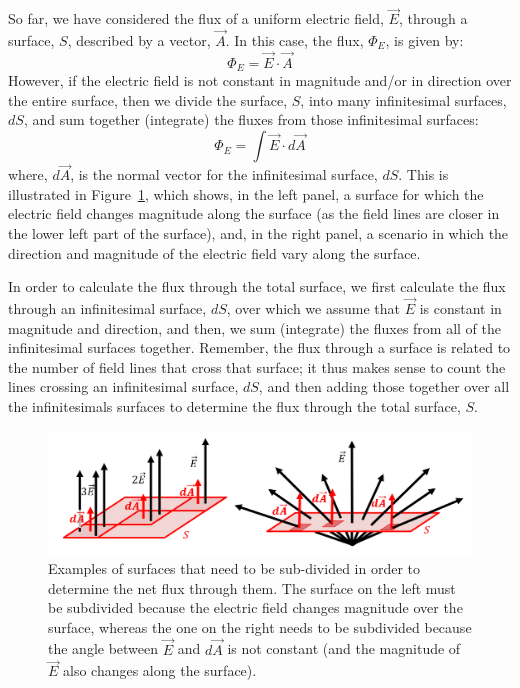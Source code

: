 So far, we have considered the flux of a uniform electric field, $\vec E$, through a surface, $S$, described by a vector, $\vec A$. In this case, the flux, $\Phi_E$, is given by:
\begin{equation}
\Phi_E=\vec E\cdot \vec A
\end{equation}
However, if the electric field is not constant in magnitude and/or in direction over the entire surface, then we divide the surface, $S$, into many infinitesimal surfaces, $dS$, and sum together (integrate) the fluxes from those infinitesimal surfaces:
\begin{equation}
\boxed{\Phi_E=\int \vec E\cdot d\vec A}
\end{equation}
where, $d\vec A$, is the normal vector for the infinitesimal surface, $dS$. This is illustrated in Figure~\ref{fig:gauss:fluxdA}, which shows, in the left panel, a surface for which the electric field changes magnitude along the surface (as the field lines are closer in the lower left part of the surface), and, in the right panel, a scenario in which the direction and magnitude of the electric field vary along the surface.

In order to calculate the flux through the total surface, we first calculate the flux through an infinitesimal surface, $dS$, over which we assume that $\vec E$ is constant in magnitude and direction, and then, we sum (integrate) the fluxes from all of the infinitesimal surfaces together. Remember, the flux through a surface is related to the number of field lines that cross that surface; it thus makes sense to count the lines crossing an infinitesimal surface, $dS$, and then adding those together over all the infinitesimals surfaces to determine the flux through the total surface, $S$.

\begin{figure}[!htbp]
\centering
\includegraphics[width=0.9\linewidth]{files/fluxdA-675e21c7412f32ffebdb6ac667e6b1ef.png}
\caption[]{Examples of surfaces that need to be sub-divided in order to determine the net flux through them. The surface on the left must be subdivided because the electric field changes magnitude over the surface, whereas the one on the right needs to be subdivided because the angle between $\vec E$ and $d\vec A$ is not constant (and the magnitude of $\vec E$ also changes along the surface).}
\label{fig:gauss:fluxdA}
\end{figure}

